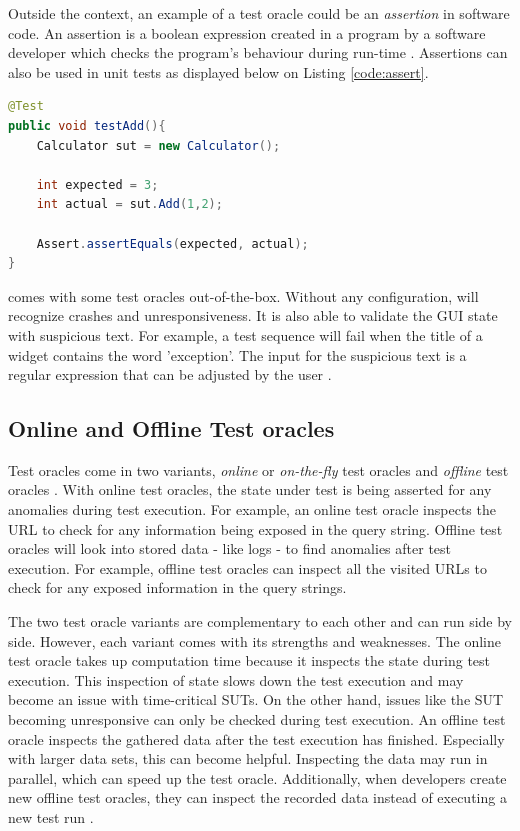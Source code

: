 Outside the \testar context, an example of a test oracle could be an \emph{assertion} in software code. An assertion is a boolean expression created in a program by a software developer which checks the program's behaviour during run-time \cite{barr2014oracle}. Assertions can also be used in unit tests as displayed below on Listing \ref{code:assert}. 

\begin{lstlisting}[language=Java, caption=Example assertion, label=code:assert]
@Test
public void testAdd(){
    Calculator sut = new Calculator();

    int expected = 3;
    int actual = sut.Add(1,2);

    Assert.assertEquals(expected, actual);
}
\end{lstlisting}

\testar comes with some test oracles out-of-the-box. Without any configuration, \testar will recognize crashes and unresponsiveness. It is also able to validate the GUI state with suspicious text. For example, a test sequence will fail when the title of a widget contains the word 'exception'. The input for the suspicious text is a regular expression that can be adjusted by the \testar user \cite{VosAho2021}. 

\subsection{Online and Offline Test oracles}
Test oracles come in two variants, \emph{online} or \emph{on-the-fly} test oracles and \emph{offline} test oracles \cite{VosAho2021}. With online test oracles, the state under test is being asserted for any anomalies during test execution. For example,  an online test oracle inspects the URL to check for any information being exposed in the query string. Offline test oracles will look into stored data - like logs - to find anomalies after test execution. For example, offline test oracles can inspect all the visited URLs to check for any exposed information in the query strings.

The two test oracle variants are complementary to each other and can run side by side. However, each variant comes with its strengths and weaknesses. The online test oracle takes up computation time because it inspects the state during test execution. This inspection of state slows down the test execution and may become an issue with time-critical SUTs. On the other hand, issues like the SUT becoming unresponsive can only be checked during test execution. An offline test oracle inspects the gathered data after the test execution has finished. Especially with larger data sets, this can become helpful. Inspecting the data may run in parallel, which can speed up the test oracle. Additionally, when developers create new offline test oracles, they can inspect the recorded data instead of executing a new test run \cite{de2019offline}.

